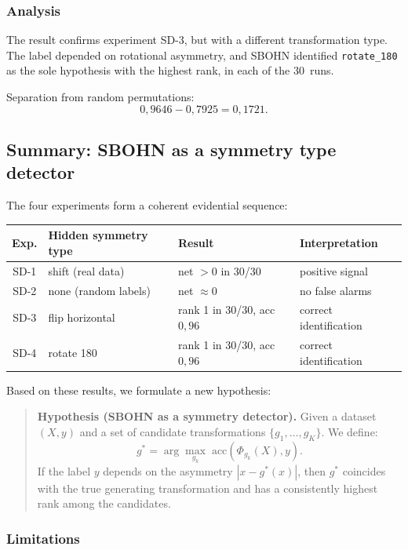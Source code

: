 \documentclass[11pt,a4paper]{report}
\begin{document}
\subsubsection{Analysis}

The result confirms experiment SD-3, but with a different transformation type. The label depended on rotational asymmetry, and SBOHN identified \texttt{rotate\_180} as the sole hypothesis with the highest rank, in each of the 30~runs.

Separation from random permutations:
\[
0{,}9646-0{,}7925=0{,}1721.
\]

\subsection{Summary: SBOHN as a symmetry type detector}

The four experiments form a coherent evidential sequence:

\begin{center}
\begin{tabular}{clll}
\toprule
Exp. & Hidden symmetry type & Result & Interpretation \\
\midrule
SD-1 & shift (real data) & net $> 0$ in 30/30 & positive signal \\
SD-2 & none (random labels) & net $\approx 0$ & no false alarms \\
SD-3 & flip horizontal & rank 1 in 30/30, acc $0{,}96$ & correct identification \\
SD-4 & rotate 180 & rank 1 in 30/30, acc $0{,}96$ & correct identification \\
\bottomrule
\end{tabular}
\end{center}

Based on these results, we formulate a new hypothesis:

\begin{quote}
\textbf{Hypothesis (SBOHN as a symmetry detector).}
Given a dataset $(X,y)$ and a set of candidate transformations $\{g_1,\dots,g_K\}$. We define:
\[
g^*=\arg\max_{g_k}\;\mathrm{acc}(\Phi_{g_k}(X),y).
\]
If the label $y$ depends on the asymmetry $|x-g^*(x)|$, then $g^*$ coincides with the true generating transformation and has a consistently highest rank among the candidates.
\end{quote}

\subsubsection{Limitations}
\end{document}
